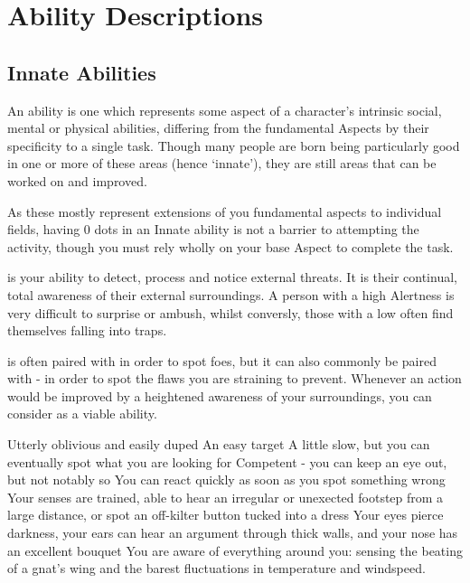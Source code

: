 
\section{Ability Descriptions}

\subsection{Innate Abilities}

An  ability is one which represents some aspect of a character's intrinsic social, mental or physical abilities, differing from the fundamental Aspects by their specificity to a single task. Though many people are born being particularly good in one or more of these areas (hence `innate'), they are still areas that can be worked on and improved. 

As these mostly represent extensions of you fundamental aspects to individual fields, having 0 dots in an Innate ability is not a barrier to attempting the activity, though you must rely wholly on your base Aspect to complete the task. 


 is your ability to detect, process and notice external threats. It is their continual, total awareness of their external surroundings. A person with a high Alertness is very difficult to surprise or ambush, whilst conversly, those with a low  often find themselves falling into traps.

 is often paired with  in order to spot foes, but it can also commonly be paired with  - in order to spot the flaws you are straining to prevent. Whenever an action would be improved by a heightened awareness of your surroundings, you can consider  as a viable ability. 

\ratingTable
{Utterly oblivious and easily duped}
{An easy target}
{A little slow, but you can eventually spot what you are looking for}
{Competent - you can keep an eye out, but not notably so}
{You can react quickly as soon as you spot something wrong}
{Your senses are trained, able to hear an irregular or unexected footstep from a large distance, or spot an off-kilter button tucked into a dress}
{Your eyes pierce darkness, your ears can hear an argument through thick walls, and your nose has an excellent bouquet}
{You are aware of everything around you: sensing the beating of a gnat's wing and the barest fluctuations in temperature and windspeed.}


